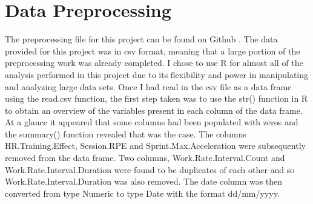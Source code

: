 \section{Data Preprocessing}
The preprocessing file for this project can be found on Github \cite{PreprocessingFile}. The data provided for this project was in csv format, meaning that a large portion of the preprocessing work was already completed. I chose to use R for almost all of the analysis performed in this project due to its flexibility and power in manipulating and analyzing large data sets. Once I had read in the csv file as a data frame using the read.csv function, the first step taken was to use the str() function in R to obtain an overview of the variables present in each column of the data frame. At a glance it appeared that some columns had been populated with zeros and the summary() function revealed that was the case. The columns HR.Training.Effect, Session.RPE and Sprint.Max.Acceleration were subsequently removed from the data frame. Two columns, Work.Rate.Interval.Count and Work.Rate.Interval.Duration were found to be duplicates of each other and so Work.Rate.Interval.Duration was also removed. The date column was then converted from type Numeric to type Date with the format dd/mm/yyyy.

